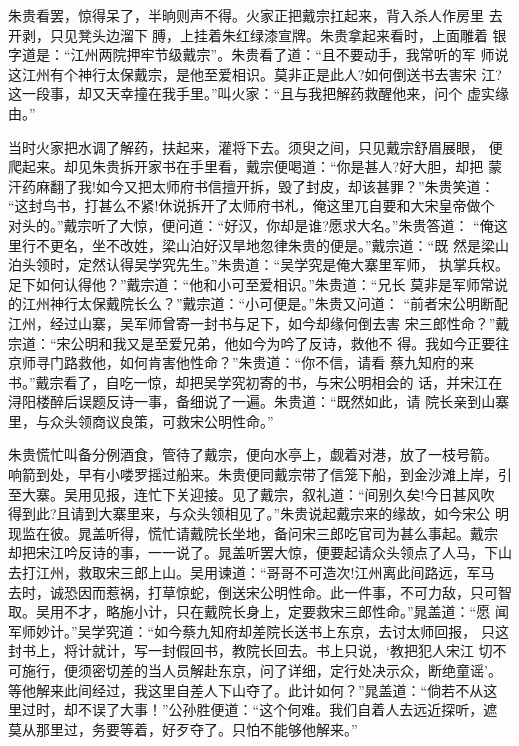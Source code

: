 朱贵看罢，惊得呆了，半晌则声不得。火家正把戴宗扛起来，背入杀人作房里
去开剥，只见凳头边溜下膊，上挂着朱红绿漆宣牌。朱贵拿起来看时，上面雕着
银字道是：“江州两院押牢节级戴宗”。朱贵看了道：“且不要动手，我常听的军
师说这江州有个神行太保戴宗，是他至爱相识。莫非正是此人?如何倒送书去害宋
江?这一段事，却又天幸撞在我手里。”叫火家：“且与我把解药救醒他来，问个
虚实缘由。”

当时火家把水调了解药，扶起来，灌将下去。须臾之间，只见戴宗舒眉展眼，
便爬起来。却见朱贵拆开家书在手里看，戴宗便喝道：“你是甚人?好大胆，却把
蒙汗药麻翻了我!如今又把太师府书信擅开拆，毁了封皮，却该甚罪？”朱贵笑道：
“这封鸟书，打甚么不紧!休说拆开了太师府书札，俺这里兀自要和大宋皇帝做个
对头的。”戴宗听了大惊，便问道：“好汉，你却是谁?愿求大名。”朱贵答道：
“俺这里行不更名，坐不改姓，梁山泊好汉旱地忽律朱贵的便是。”戴宗道：“既
然是梁山泊头领时，定然认得吴学究先生。”朱贵道：“吴学究是俺大寨里军师，
执掌兵权。足下如何认得他？”戴宗道：“他和小可至爱相识。”朱贵道：“兄长
莫非是军师常说的江州神行太保戴院长么？”戴宗道：“小可便是。”朱贵又问道：
“前者宋公明断配江州，经过山寨，吴军师曾寄一封书与足下，如今却缘何倒去害
宋三郎性命？”戴宗道：“宋公明和我又是至爱兄弟，他如今为吟了反诗，救他不
得。我如今正要往京师寻门路救他，如何肯害他性命？”朱贵道：“你不信，请看
蔡九知府的来书。”戴宗看了，自吃一惊，却把吴学究初寄的书，与宋公明相会的
话，并宋江在浔阳楼醉后误题反诗一事，备细说了一遍。朱贵道：“既然如此，请
院长亲到山寨里，与众头领商议良策，可救宋公明性命。”

朱贵慌忙叫备分例酒食，管待了戴宗，便向水亭上，觑着对港，放了一枝号箭。
响箭到处，早有小喽罗摇过船来。朱贵便同戴宗带了信笼下船，到金沙滩上岸，引
至大寨。吴用见报，连忙下关迎接。见了戴宗，叙礼道：“间别久矣!今日甚风吹
得到此?且请到大寨里来，与众头领相见了。”朱贵说起戴宗来的缘故，如今宋公
明现监在彼。晁盖听得，慌忙请戴院长坐地，备问宋三郎吃官司为甚么事起。戴宗
却把宋江吟反诗的事，一一说了。晁盖听罢大惊，便要起请众头领点了人马，下山
去打江州，救取宋三郎上山。吴用谏道：“哥哥不可造次!江州离此间路远，军马
去时，诚恐因而惹祸，打草惊蛇，倒送宋公明性命。此一件事，不可力敌，只可智
取。吴用不才，略施小计，只在戴院长身上，定要救宋三郎性命。”晁盖道：“愿
闻军师妙计。”吴学究道：“如今蔡九知府却差院长送书上东京，去讨太师回报，
只这封书上，将计就计，写一封假回书，教院长回去。书上只说，‘教把犯人宋江
切不可施行，便须密切差的当人员解赴东京，问了详细，定行处决示众，断绝童谣’。
等他解来此间经过，我这里自差人下山夺了。此计如何？”晁盖道：“倘若不从这
里过时，却不误了大事！”公孙胜便道：“这个何难。我们自着人去远近探听，遮
莫从那里过，务要等着，好歹夺了。只怕不能够他解来。”

